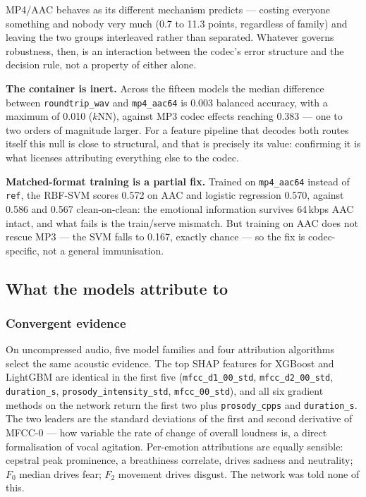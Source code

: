 \documentclass[a4paper,9pt,twocolumn]{extarticle}
\newcommand{\ft}[1]{\texttt{\footnotesize #1}}
\begin{document}
MP4/AAC behaves as its different mechanism predicts --- costing everyone
something and nobody very much (0.7 to 11.3 points, regardless of family) and
leaving the two groups interleaved rather than separated. Whatever governs
robustness, then, is an interaction between the codec's error structure and the
decision rule, not a property of either alone.

\textbf{The container is inert.} Across the fifteen models the median
difference between \ft{roundtrip\_wav} and \ft{mp4\_aac64} is 0.003 balanced
accuracy, with a maximum of 0.010 ($k$NN), against MP3 codec effects reaching
0.383 --- one to two orders of magnitude larger. For a feature pipeline that
decodes both routes itself this null is close to structural, and that is
precisely its value: confirming it is what licenses attributing everything else
to the codec.

\textbf{Matched-format training is a partial fix.} Trained on \ft{mp4\_aac64}
instead of \ft{ref}, the RBF-SVM scores 0.572 on AAC and logistic regression
0.570, against 0.586 and 0.567 clean-on-clean: the emotional information
survives 64\,kbps AAC intact, and what fails is the train/serve mismatch. But
training on AAC does not rescue MP3 --- the SVM falls to 0.167, exactly chance
--- so the fix is codec-specific, not a general immunisation.

\subsection{What the models attribute to}\label{sec:xai}
\subsubsection{Convergent evidence}
On uncompressed audio, five model families and four attribution algorithms
select the same acoustic evidence. The top SHAP features for XGBoost and
LightGBM are identical in the first five (\ft{mfcc\_d1\_00\_std},
\ft{mfcc\_d2\_00\_std}, \ft{duration\_s}, \ft{prosody\_intensity\_std},
\ft{mfcc\_00\_std}), and all six gradient methods on the network return the
first two plus \ft{prosody\_cpps} and \ft{duration\_s}. The two leaders are the
standard deviations of the first and second derivative of MFCC-0 --- how
variable the rate of change of overall loudness is, a direct formalisation of
vocal agitation. Per-emotion attributions are equally sensible: cepstral peak
prominence, a breathiness correlate, drives sadness and neutrality; $F_0$
median drives fear; $F_2$ movement drives disgust. The network was told none of
this.
\end{document}

